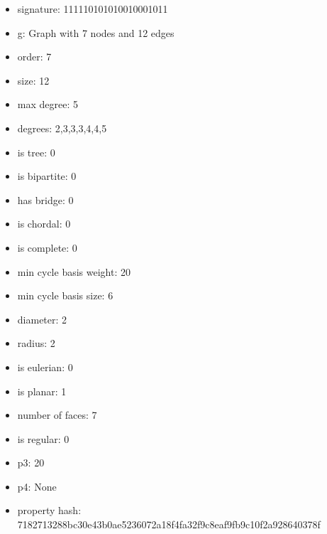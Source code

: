 \begin{itemize}
\item signature: 111110101010010001011
\item g: Graph with 7 nodes and 12 edges
\item order: 7
\item size: 12
\item max degree: 5
\item degrees: 2,3,3,3,4,4,5
\item is tree: 0
\item is bipartite: 0
\item has bridge: 0
\item is chordal: 0
\item is complete: 0
\item min cycle basis weight: 20
\item min cycle basis size: 6
\item diameter: 2
\item radius: 2
\item is eulerian: 0
\item is planar: 1
\item number of faces: 7
\item is regular: 0
\item p3: 20
\item p4: None
\item property hash: 7182713288bc30e43b0ae5236072a18f4fa32f9c8eaf9fb9c10f2a928640378f
\end{itemize}
\newpage
\begin{figure}
\end{figure}
